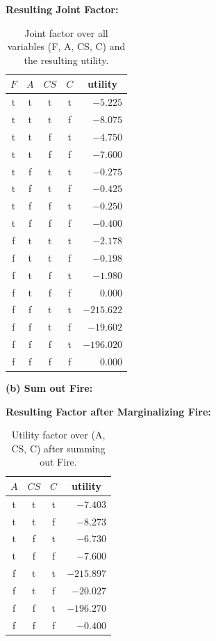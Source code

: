 \documentclass[11pt]{article}
\begin{document}
\medskip
\textbf{Resulting Joint Factor:}
\begin{table}[H]
\centering
\begin{tabular}{ccccr}
\toprule
$F$ & $A$ & $CS$ & $C$ & \multicolumn{1}{c}{utility}\\
\midrule
t & t & t & t & $-5.225$\\
t & t & t & f & $-8.075$\\
t & t & f & t & $-4.750$\\
t & t & f & f & $-7.600$\\
t & f & t & t & $-0.275$\\
t & f & t & f & $-0.425$\\
t & f & f & t & $-0.250$\\
t & f & f & f & $-0.400$\\
f & t & t & t & $-2.178$\\
f & t & t & f & $-0.198$\\
f & t & f & t & $-1.980$\\
f & t & f & f & $0.000$\\
f & f & t & t & $-215.622$\\
f & f & t & f & $-19.602$\\
f & f & f & t & $-196.020$\\
f & f & f & f & $0.000$\\
\bottomrule
\end{tabular}
\caption{Joint factor over all variables (F, A, CS, C) and the resulting utility.}
\end{table}

\bigskip
\textbf{(b) Sum out Fire:}

\medskip
\textbf{Resulting Factor after Marginalizing Fire:}
\begin{table}[H]
\centering
\begin{tabular}{cccr}
\toprule
$A$ & $CS$ & $C$ & \multicolumn{1}{c}{utility}\\
\midrule
t & t & t & $-7.403$\\
t & t & f & $-8.273$\\
t & f & t & $-6.730$\\
t & f & f & $-7.600$\\
f & t & t & $-215.897$\\
f & t & f & $-20.027$\\
f & f & t & $-196.270$\\
f & f & f & $-0.400$\\
\bottomrule
\end{tabular}
\caption{Utility factor over (A, CS, C) after summing out Fire.}
\end{table}
\end{document}
